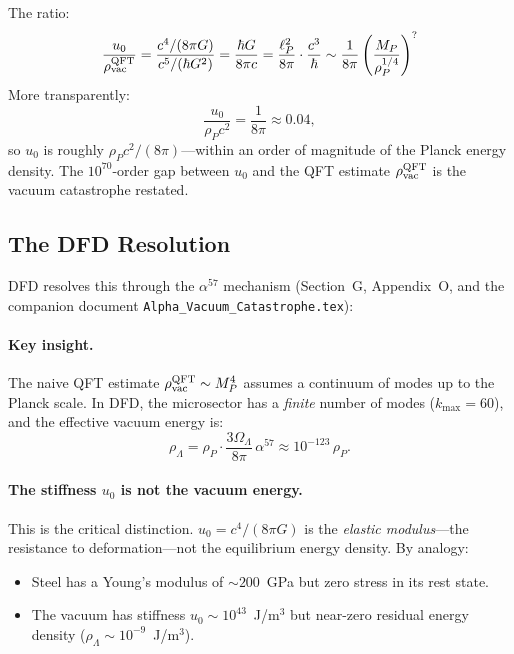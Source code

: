 \documentclass[11pt]{article}
\theoremstyle{plain}
\theoremstyle{definition}
\theoremstyle{remark}
\begin{document}
The ratio:
\begin{equation}
\frac{u_0}{\rho_{\rm vac}^{\rm QFT}} = \frac{c^4/(8\pi G)}{c^5/(\hbar G^2)}
= \frac{\hbar G}{8\pi c} = \frac{\ell_P^2}{8\pi} \cdot \frac{c^3}{\hbar}
\sim \frac{1}{8\pi}\left(\frac{M_P}{\rho_P^{1/4}}\right)^{?}
\end{equation}
More transparently:
\begin{equation}
\frac{u_0}{\rho_P c^2} = \frac{1}{8\pi} \approx 0.04,
\end{equation}
so $u_0$ is roughly $\rho_P c^2 / (8\pi)$---within an order of magnitude
of the Planck energy density. The $10^{70}$-order gap between $u_0$ and
the QFT estimate $\rho_{\rm vac}^{\rm QFT}$ is the vacuum catastrophe
restated.

\subsection{The DFD Resolution}

DFD resolves this through the $\alpha^{57}$ mechanism
(Section~G, Appendix~O, and the companion document
\texttt{Alpha\_Vacuum\_Catastrophe.tex}):

\paragraph{Key insight.}
The naive QFT estimate $\rho_{\rm vac}^{\rm QFT} \sim M_P^4$
assumes a continuum of modes up to the Planck scale. In DFD, the
microsector has a \emph{finite} number of modes ($k_{\max} = 60$), and
the effective vacuum energy is:
\begin{equation}
\rho_\Lambda = \rho_P \cdot \frac{3\Omega_\Lambda}{8\pi}\,\alpha^{57}
\approx 10^{-123}\,\rho_P.
\end{equation}

\paragraph{The stiffness $u_0$ is not the vacuum energy.}
This is the critical distinction. $u_0 = c^4/(8\pi G)$ is the
\emph{elastic modulus}---the resistance to deformation---not the
equilibrium energy density. By analogy:
\begin{itemize}
\item Steel has a Young's modulus of $\sim 200$~GPa but zero
stress in its rest state.
\item The vacuum has stiffness $u_0 \sim 10^{43}$~J/m$^3$ but
near-zero residual energy density ($\rho_\Lambda \sim 10^{-9}$~J/m$^3$).
\end{itemize}
\end{document}
